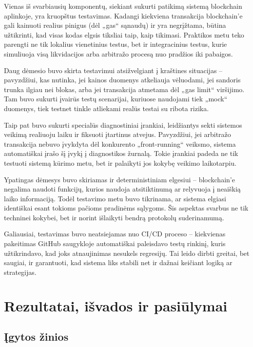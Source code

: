 \documentclass[]{VUMIFTemplateClass}
\begin{document}
Vienas iš svarbiausių komponentų, siekiant sukurti patikimą sistemą blockchain aplinkoje, yra kruopštus testavimas. Kadangi kiekviena transakcija blockchain’e gali kainuoti realius pinigus (dėl „gas“ sąnaudų) ir yra negrįžtama, būtina užtikrinti, kad visas kodas elgsis tiksliai taip, kaip tikimasi. Praktikos metu teko parengti ne tik lokalius vienetinius testus, bet ir integracinius testus, kurie simuliuoja visą likvidacijos arba arbitražo procesą nuo pradžios iki pabaigos.

Daug dėmesio buvo skirta testavimui atsižvelgiant į kraštines situacijas – pavyzdžiui, kas nutinka, jei kainos duomenys atkeliauja vėluodami, jei sandoris trunka ilgiau nei blokas, arba jei transakcija atmetama dėl „gas limit“ viršijimo. Tam buvo sukurti įvairūs testų scenarijai, kuriuose naudojami tiek „mock“ duomenys, tiek testnet tinkle atliekami realūs testai su ribota rizika.

Taip pat buvo sukurti specialūs diagnostiniai įrankiai, leidžiantys sekti sistemos veikimą realiuoju laiku ir fiksuoti įtartinus atvejus. Pavyzdžiui, jei arbitražo transakcija nebuvo įvykdyta dėl konkurento „front-running“ veiksmo, sistema automatiškai įrašo šį įvykį į diagnostikos žurnalą. Tokie įrankiai padeda ne tik testuoti sistemą kūrimo metu, bet ir palaikyti jos kokybę veikimo laikotarpiu.

Ypatingas dėmesys buvo skiriamas ir deterministiniam elgesiui – blockchain'e negalima naudoti funkcijų, kurios naudoja atsitiktinumą ar relyvuoja į neaiškią laiko informaciją. Todėl testavimo metu buvo tikrinama, ar sistema elgiasi identiškai esant tokioms pačioms pradinėms sąlygoms. Šis aspektas svarbus ne tik techninei kokybei, bet ir norint išlaikyti bendrą protokolų suderinamumą.

Galiausiai, testavimas buvo neatsiejamas nuo CI/CD proceso – kiekvienas pakeitimas GitHub saugykloje automatiškai paleisdavo testų rinkinį, kuris užtikrindavo, kad joks atnaujinimas nesukels regresijų. Tai leido dirbti greitai, bet saugiai, ir garantuoti, kad sistema liks stabili net ir dažnai keičiant logiką ar strategijas.

\section{Rezultatai, išvados ir pasiūlymai}

\subsection{Įgytos žinios}
\end{document}
